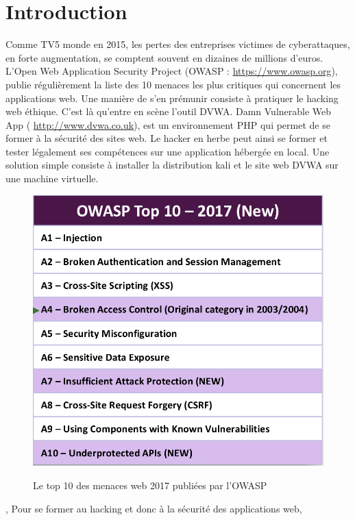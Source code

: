 
\pagebreak

\section*{Introduction}
Comme TV5 monde en 2015, les pertes des entreprises victimes de cyberattaques, en forte augmentation, se comptent souvent en dizaines de millions d'euros. L'Open Web Application Security Project (OWASP : {\color{blue} \url{https://www.owasp.org}}), publie régulièrement la liste des 10 menaces les plus critiques qui concernent les applications web. Une manière de s'en prémunir consiste à pratiquer le hacking web éthique. C'est là qu'entre en scène l'outil DVWA. Damn Vulnerable Web App ({\color{blue} \url{http://www.dvwa.co.uk}}), est un environnement PHP qui permet de se former à la sécurité des sites web. Le hacker en herbe peut ainsi se former et tester légalement ses compétences sur une application hébergée en local. Une solution simple consiste à installer la distribution kali et le site web DVWA sur une machine virtuelle.

\begin{figure}[!h]
	\begin{center}
		\label{10_menaces}
		\includegraphics[scale=0.4]{images/10_menaces.png}
		\caption{Le top 10 des menaces web 2017 publiées par l'OWASP}
	\end{center}
\end{figure}



, 
Pour se former au hacking et donc à la sécurité des applications web, 
